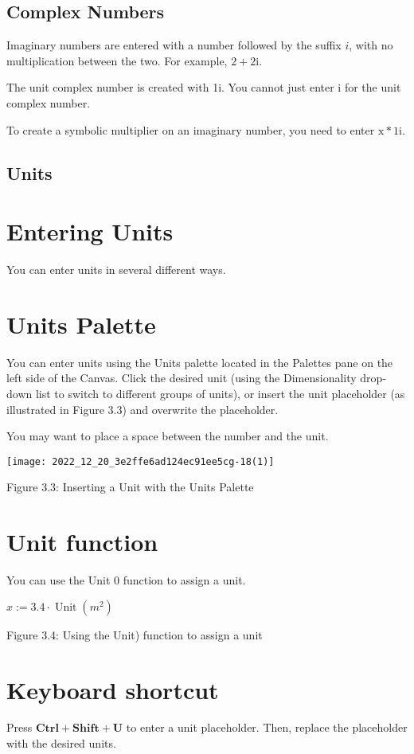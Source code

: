 \subsection{Complex Numbers}
Imaginary numbers are entered with a number followed by the suffix $i$, with no multiplication between the two. For example, $2+2 \mathrm{i}$.

The unit complex number is created with 1i. You cannot just enter i for the unit complex number.

To create a symbolic multiplier on an imaginary number, you need to enter $\mathrm{x} * 1 \mathrm{i}$.

\subsection{Units}
\section{Entering Units}
You can enter units in several different ways.

\section{Units Palette}
You can enter units using the Units palette located in the Palettes pane on the left side of the Canvas. Click the desired unit (using the Dimensionality drop-down list to switch to different groups of units), or insert the unit placeholder (as illustrated in Figure 3.3) and overwrite the placeholder.

You may want to place a space between the number and the unit.

\begin{center}
\texttt{[image: 2022\_12\_20\_3e2ffe6ad124ec91ee5cg-18(1)]}
\end{center}

Figure 3.3: Inserting a Unit with the Units Palette

\section{Unit function}
You can use the Unit 0 function to assign a unit.

$x:=3.4 \cdot \operatorname{Unit}\left(m^{2}\right)$

Figure 3.4: Using the Unit) function to assign a unit

\section{Keyboard shortcut}
Press $\mathbf{C t r l}+\mathbf{S h i f t}+\mathbf{U}$ to enter a unit placeholder. Then, replace the placeholder with the desired units.

